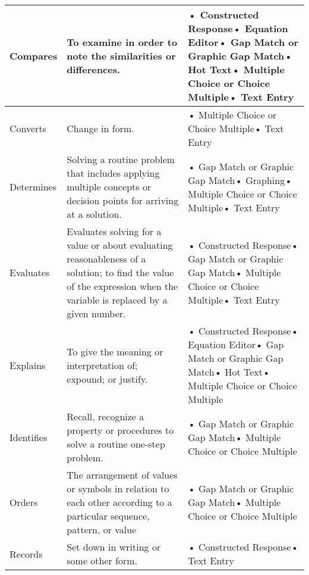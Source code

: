 \documentclass[11pt, English]{article}
\begin{document}
\begin{longtable}{|p{1.8cm}|p{6.0cm}|p{8.7cm}|}
 Compares & To examine in order to note the similarities or differences. & • Constructed Response\newline• Equation Editor\newline• Gap Match or Graphic Gap Match\newline• Hot Text\newline• Multiple Choice or Choice Multiple\newline• Text Entry\\
 \hline
	  Converts & Change in form. & • Multiple Choice or Choice Multiple\newline• Text Entry\\
 \hline
	  Determines & Solving a routine problem that includes applying multiple concepts or decision points for arriving at a solution.  & • Gap Match or Graphic Gap Match\newline• Graphing\newline• Multiple Choice or Choice Multiple\newline• Text Entry\\
 \hline
	  Evaluates & Evaluates solving for  a value or about evaluating reasonableness of a solution;  to find the value of the expression when the variable is replaced by a given number.  & • Constructed Response\newline• Gap Match or Graphic Gap Match\newline• Multiple Choice or Choice Multiple\newline• Text Entry\\
 \hline
	  Explains & To give the meaning or interpretation of; expound; or justify. & • Constructed Response\newline• Equation Editor\newline• Gap Match or Graphic Gap Match\newline• Hot Text\newline• Multiple Choice or Choice Multiple\\
 \hline
	  Identifies & Recall, recognize a property or procedures to solve a routine one-step problem.  & • Gap Match or Graphic Gap Match\newline• Multiple Choice or Choice Multiple\\
 \hline
	  Orders & The arrangement of values or symbols in relation to each other according to a particular sequence, pattern, or value & • Gap Match or Graphic Gap Match\newline• Multiple Choice or Choice Multiple\\
 \hline
	  Records & Set down in writing or some other form. & • Constructed Response\newline• Text Entry\\

\end{longtable}
\end{document}
